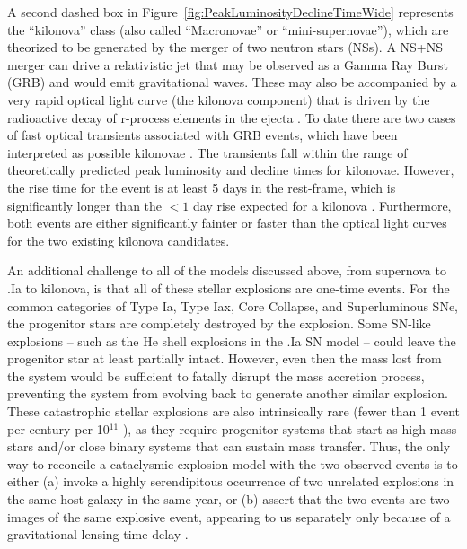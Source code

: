 A second dashed box in Figure~\ref{fig:PeakLuminosityDeclineTimeWide}
represents the ``kilonova'' class (also called ``Macronovae'' or
``mini-supernovae''), which are theorized to be generated by the
merger of two neutron stars (NSs). A NS+NS merger can drive a
relativistic jet that may be observed as a Gamma Ray Burst (GRB) and
would emit gravitational waves.  These may also be accompanied by a
very rapid optical light curve (the kilonova component) that is driven
by the radioactive decay of r-process elements in the ejecta
\citep{Li:1998a,Kulkarni:2005}.  To date there are two cases of fast
optical transients associated with GRB events, which have been
interpreted as possible kilonovae \citep{Perley:2009,Tanvir:2013}.
The \spock transients fall within the range of theoretically predicted
peak luminosity and decline times for kilonovae. However, the rise
time for the \spockone event is at least 5 days in the rest-frame,
which is significantly longer than the $<1$ day rise expected for a
kilonova \citep[e.g.][]{Metzger:2010,Barnes:2013,Kasen:2015}.
Furthermore, both \spock events are either significantly fainter or
faster than the optical light curves for the two existing kilonova
candidates.

An additional challenge to all of the models discussed above, from
supernova to .Ia to kilonova, is that all of these stellar explosions
are one-time events.  For the common categories of Type Ia, Type Iax,
Core Collapse, and Superluminous SNe, the progenitor stars are
completely destroyed by the explosion.  Some SN-like explosions --
such as the He shell explosions in the .Ia SN model -- could leave the
progenitor star at least partially intact.  However, even then the
mass lost from the system would be sufficient to fatally disrupt the
mass accretion process, preventing the system from evolving back to
generate another similar explosion.  These catastrophic stellar
explosions are also intrinsically rare (fewer than 1 event per century
per 10$^11$ \Msun), as they require progenitor systems that start as high
mass stars and/or close binary systems that can sustain mass transfer.
Thus, the only way to reconcile a cataclysmic explosion model with the
two observed \spock events is to either (a) invoke a highly
serendipitous occurrence of two unrelated explosions in the same host
galaxy in the same year, or (b) assert that the two events are two
images of the same explosive event, appearing to us separately only
because of a gravitational lensing time delay \citep[as was the case
  for the 5 images of SN Refsdal][]{Kelly:2015a,Kelly:2016}.

